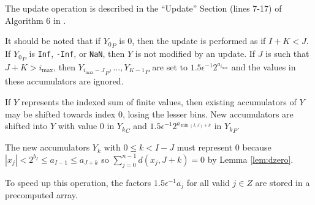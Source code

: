     The update operation is described in the ``Update'' Section (lines 7-17) of Algorithm $6$ in \cite{repsum}.

    It should be noted that if ${Y_0}_P$ is 0, then the update is performed as
    if $I + K < J$. If ${Y_0}_P$ is \texttt{Inf}, \texttt{-Inf}, or
    \texttt{NaN}, then $Y$ is not modified by an update.
    If $J$ is such that $J + K > i_{\max}$, then
    ${Y_{i_{\max} - J}}_P, ...,  {Y_{K - 1}}_P$ are set to $1.5
    \epsilon^{-1}2^{a_{i_{\max}}}$ and the values in these accumulators are
    ignored.

    If $Y$ represents the indexed sum of finite values, then existing accumulators of $Y$ may be shifted towards index $0$, losing the lesser bins. New accumulators are shifted into $Y$ with value $0$ in ${Y_k}_C$ and $1.5 \epsilon^{-1} 2^{a_{\min(I, J) + k}}$ in ${Y_k}_P$.

    The new accumulators $Y_k$ with $0 \leq k < I - J$ must represent 0 because
    $|x_j| < 2^{b_I} \leq a_{I - 1} \leq a_{J + k}$ so
    \(
      \sum\limits_{j = 0}^{n - 1} d(x_j, J + k) = 0
    \) by Lemma \ref{lem:dzero}.

    To speed up this operation, the factors $1.5  \epsilon^{-1}  a_j$ for all
    valid $j \in Z$ are stored in a precomputed array.

